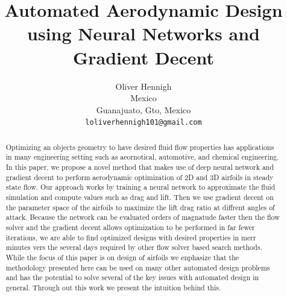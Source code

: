 \documentclass{article} %
\title{Automated Aerodynamic Design using Neural Networks and Gradient Decent}
\author{Oliver Hennigh \\
Mexico\\
Guanajuato, Gto, Mexico \\
\texttt{loliverhennigh101@gmail.com} \\
}
\begin{document}
\maketitle

\begin{abstract}

Optimizing an objects geometry to have desired fluid flow properties has applications in many engineering setting such as aeornotical, automotive, and chemical engineering. In this paper, we propose a novel method that makes use of deep neural network and gradient decent to perform aerodynamic optimization of 2D and 3D airfoils in steady state flow. Our approach works by training a neural network to approximate the fluid simulation and compute values such as drag and lift. Then we use gradient decent on the parameter space of the airfoils to maximize the lift drag ratio at diffrent angles of attack. Because the network can be evaluated orders of magnatude faster then the flow solver and the gradient decent allows optimization to be performed in far fewer iterations, we are able to find optimized designs with desired properties in merr minutes vers the several days required by other flow solver based search methods. While the focus of this paper is on design of airfoils we enphasize that the methodology presented here can be used on many other automated design problems and has the potential to solve several of the key issues with automated design in general. Through out this work we present the intuition behind this.

\end{abstract}
\end{document}
